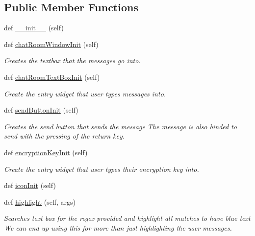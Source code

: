 \subsection*{Public Member Functions}
\begin{DoxyCompactItemize}
\item 
def \hyperlink{classgui_version_1_1_chat_client_g_u_i_ae6788c5b8f15cd3ac7a844cee72e06a3}{\+\_\+\+\_\+init\+\_\+\+\_\+} (self)
\item 
def \hyperlink{classgui_version_1_1_chat_client_g_u_i_a768dd49f34840a662bc12636dcb8f18a}{chat\+Room\+Window\+Init} (self)
\begin{DoxyCompactList}\small\item\em Creates the textbox that the messages go into. \end{DoxyCompactList}\item 
def \hyperlink{classgui_version_1_1_chat_client_g_u_i_a1788a126553ae97447343bd9f4187624}{chat\+Room\+Text\+Box\+Init} (self)
\begin{DoxyCompactList}\small\item\em Create the entry widget that user types messages into. \end{DoxyCompactList}\item 
def \hyperlink{classgui_version_1_1_chat_client_g_u_i_ad5e98841e008476eee6015e5b8bf6eee}{send\+Button\+Init} (self)
\begin{DoxyCompactList}\small\item\em Creates the send button that sends the message The meesage is also binded to send with the pressing of the return key. \end{DoxyCompactList}\item 
def \hyperlink{classgui_version_1_1_chat_client_g_u_i_a16414e83201878b6a1565fdf0600f15a}{encryption\+Key\+Init} (self)
\begin{DoxyCompactList}\small\item\em Create the entry widget that user types their encryption key into. \end{DoxyCompactList}\item 
def \hyperlink{classgui_version_1_1_chat_client_g_u_i_acb99a090317b6806b24e91ef4ac4b0e2}{icon\+Init} (self)
\item 
def \hyperlink{classgui_version_1_1_chat_client_g_u_i_ac68b416d5a4d4962b76752f1aa78bccb}{highlight} (self, args)
\begin{DoxyCompactList}\small\item\em Searches text box for the regex provided and highlight all matches to have blue text We can end up using this for more than just highlighting the user messages. \end{DoxyCompactList}\item 

\end{DoxyCompactItemize}
